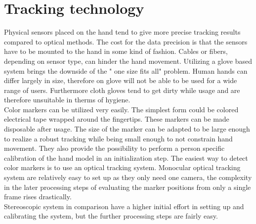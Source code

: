 \section{Tracking technology}
Physical sensors placed on the hand tend to give more precise tracking results compared to optical methods. The cost for the data precision is that the sensors have to be mounted to the hand in some kind of fashion. Cables or fibers, depending on sensor type, can hinder the hand movement. Utilizing  a glove based system brings the downside of the " one size fits all" problem. Human hands can differ largely in size, therefore on glove will not be able to be used for a wide range of users. Furthermore cloth gloves tend to get dirty while usage and are therefore unsuitable in therms of hygiene.\\

Color markers can be utilized very easily. The simplest form could be colored electrical tape wrapped around the fingertips. These markers can be made disposable after usage. The size of the marker can be adapted to be large enough to realize a robust tracking while being small enough to not constrain hand movement. They also provide the possibility to perform a person specific calibration of the hand model in an initialization step.
The easiest way to detect color markers is to use an optical tracking system.
Monocular optical tracking system are relatively easy to set up as they only need one camera, the complexity in the later processing steps of evaluating the marker positions from  only a single frame rises drastically.\\
Stereoscopic system in comparison have a higher initial effort in setting up and calibrating the system, but the further processing steps are fairly easy. 

